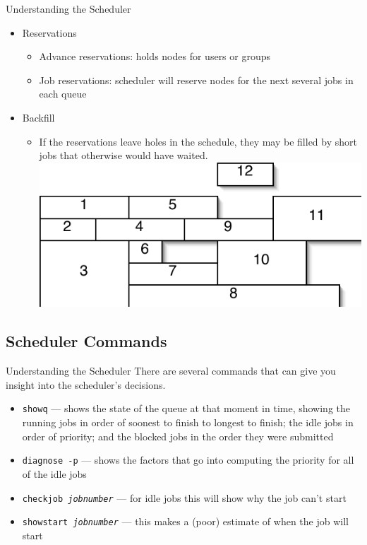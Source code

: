 \documentclass{beamer}
\begin{document}
\begin{frame}{Understanding the Scheduler}
  \begin{itemize}
  \item<1-> Reservations
    \begin{itemize}
    \item<1-> Advance reservations: holds nodes for users or groups
    \item<1-> Job reservations: scheduler will reserve nodes for the next
several jobs in each queue
    \end{itemize}
  \item<2-> Backfill
    \begin{itemize}
    \item<2-> If the reservations leave holes in the schedule, they may be
filled by short jobs that otherwise would have waited.\\
	\includegraphics{job-grid}
    \end{itemize}
  \end{itemize}
\end{frame}
\subsection{Scheduler Commands}
\begin{frame}{Understanding the Scheduler}
There are several commands that can give you insight into the scheduler's
decisions.
\begin{itemize}
\item \texttt{showq} --- shows the state of the queue at that moment in time,
showing the running jobs in order of soonest to finish to longest to finish; the
idle jobs in order of priority; and the blocked jobs in the order they were
submitted
\item \texttt{diagnose -p} --- shows the factors that go into computing the
priority for all of the idle jobs
\item \texttt{checkjob \textit{jobnumber}} --- for idle jobs this will show why
the job can't start
\item \texttt{showstart \textit{jobnumber}} --- this makes a (poor) estimate of
when the job will start
\end{itemize}
\end{frame}
\end{document}
